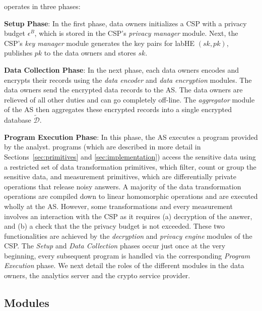 \system operates in three phases: 
 \squishlist
 \item \textbf{Setup Phase}: In the first phase, data owners initializes a \textsf{CSP} with a privacy budget $\epsilon^B$, which is stored in the \textsf{CSP}'s \textit{privacy manager} module. Next, the  \textsf{CSP}'s \textit{key manager} module generates the key pairs for labHE $(sk,pk)$, publishes $pk$ to the data owners and stores $sk$. 
 \item \textbf{Data Collection Phase}: In the next phase, each data owners encodes and encrypts their records using the \textit{data encoder} and \textit{data encryption} modules. The data owners send the encrypted data records to the \textsf{AS}. The data owners are relieved of all other duties and can go completely off-line. The \textit{aggregator} module of the \textsf{AS} then aggregates these encrypted records into a single encrypted database $\boldsymbol{\tilde{\mathcal{D}}}$. 
 \item \textbf{Program Execution Phase}: In this phase, the \textsf{AS} executes a \system program provided by the analyst. \system programs (which are described in more detail in Sections~\ref{sec:primitives} and \ref{sec:implementation}) access the sensitive data using a restricted set of data transformation primitives, which filter, count or group the sensitive data, and measurement primitives, which are differentially private operations that release noisy answers. A majority of the data transformation operations are compiled down to linear homomorphic operations and are executed wholly at the \textsf{AS}. However, some transformations and every measurement involves an interaction with the \textsf{CSP} as it requires (a) decryption of the answer, and (b) a check that the the privacy budget is not exceeded. These two functionalities are achieved by the \textit{decryption} and \textit{privacy engine} modules of the \textsf{CSP}. 
 \squishend
 The \emph{Setup} and \emph{Data Collection} phases occur just once at the very beginning, every subsequent program  is handled via the corresponding  \emph{Program Execution} phase. We next detail the roles of the different modules in the data owners, the analytics server and the crypto service provider.  
 
\subsection{\system Modules}\label{sec:modules}

